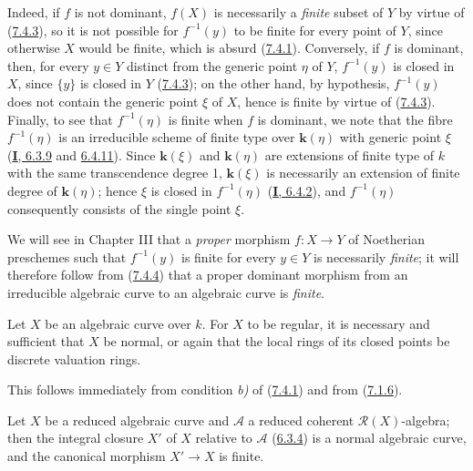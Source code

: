 Indeed, if $f$ is not dominant, $f(X)$ is necessarily a \emph{finite}
subset of $Y$ by virtue of (\hyperref[II.7.4.3]{7.4.3}), so it is not
possible for $f^{-1}(y)$ to be finite for every point of $Y$, since otherwise
$X$ would be finite, which is absurd (\hyperref[II.7.4.1]{7.4.1}).
Conversely, if $f$ is dominant, then, for every $y\in Y$ distinct from the
generic point $\eta$ of $Y$, $f^{-1}(y)$ is closed in $X$, since $\{y\}$ is
closed in $Y$ (\hyperref[II.7.4.3]{7.4.3}); on the other hand, by
hypothesis, $f^{-1}(y)$ does not contain the generic point $\xi$ of $X$, hence
is finite by virtue of (\hyperref[II.7.4.3]{7.4.3}). Finally, to see that
$f^{-1}(\eta)$ is finite when $f$ is dominant, we note that the fibre
$f^{-1}(\eta)$ is an irreducible scheme of finite type over $\boldsymbol{k}(\eta)$ with
generic point $\xi$
(\hyperref[I.6.3.9]{\textbf{I}, 6.3.9} and
\hyperref[I.6.4.11]{6.4.11}). Since $\boldsymbol{k}(\xi)$ and $\boldsymbol{k}(\eta)$ are
extensions of finite type of $k$ with the same transcendence degree 1, $\boldsymbol{k}(\xi)$
is necessarily an extension of finite degree of $\boldsymbol{k}(\eta)$; hence $\xi$ is
closed in $f^{-1}(\eta)$ (\hyperref[I.6.4.2]{\textbf{I}, 6.4.2}), and $f^{-1}(\eta)$
consequently consists of the single point $\xi$.

We will see in Chapter III that a \emph{proper} morphism $f:X\to Y$ of
Noetherian preschemes such that $f^{-1}(y)$ is finite for every $y\in Y$ is
necessarily \emph{finite}; it will therefore follow from
(\hyperref[II.7.4.4]{7.4.4}) that a proper dominant morphism from an
irreducible algebraic curve to an algebraic curve is \emph{finite}.

\begin{corollary}[7.4.5]
\label{II.7.4.5}
Let $X$ be an algebraic curve over $k$. For $X$ to be regular, it is necessary
and sufficient that $X$ be normal, or again that the local rings of its
closed points be discrete valuation rings.
\end{corollary}

This follows immediately from condition \emph{b)} of
(\hyperref[II.7.4.1]{7.4.1}) and from
(\hyperref[II.7.1.6]{7.1.6}).

\begin{corollary}[7.4.6]
\label{II.7.4.6}
Let $X$ be a reduced algebraic curve and $\mathcal{A}$ a reduced coherent
$\mathcal{R}(X)$-algebra; then the integral closure $X'$
of $X$ relative to $\mathcal{A}$ \textup{(\hyperref[II.6.3.4]{6.3.4})} is a
normal algebraic curve, and the canonical morphism $X'\to X$ is finite.
\end{corollary}

